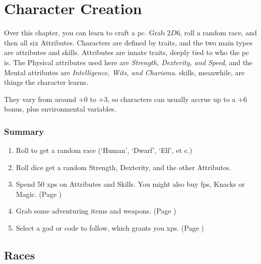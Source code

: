 \chapter{Character Creation}
\label{character_rolls}

\begin{multicols}{2}

\noindent
Over this chapter, you can learn to craft a \gls{pc}.
Grab $2D6$, roll a random race, and then all six Attributes.
Characters are defined by \glspl{trait}, and the two main types are \glspl{attribute} and \glspl{skill}.
Attributes are innate \glspl{trait}, deeply tied to who the \gls{pc} is.
The Physical \glspl{attribute} used here are \textit{Strength, Dexterity, and Speed}, and the Mental \glspl{attribute} are \textit{Intelligence, Wits, and Charisma}.
\glspl{skill}, meanwhile, are things the character learns.

  They vary from around +0 to +3, so characters can usually accrue up to a +6 bonus, plus environmental variables.

\subsection{Summary}

\begin{enumerate}

  \item
  Roll to get a random race (`Human', `Dwarf', `Elf', et c.)
  \item
  Roll dice get a random Strength, Dexterity, and the other Attributes.
  \item
  Spend 50 \glspl{xp} on Attributes and Skills. You might also buy \glspl{fp}, Knacks or Magic. (Page \pageref{xp})
  \item
  Grab some adventuring items and weapons. (Page \pageref{start_equipment})
  \item
  Select a god or code to follow, which grants you \glspl{xp}. (Page \pageref{gods_codes})

\end{enumerate}

\end{multicols}

\section{Races}
\label{raceRoll}

